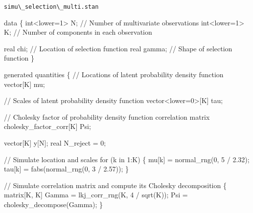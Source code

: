 \documentclass[
  letterpaper,
  DIV=11,
  numbers=noendperiod]{scrartcl}
\newenvironment{Shaded}{\begin{snugshade}}{\end{snugshade}}
\newcommand{\CommentTok}[1]{\textcolor[rgb]{0.37,0.37,0.37}{#1}}
\newcommand{\ControlFlowTok}[1]{\textcolor[rgb]{0.00,0.23,0.31}{#1}}
\newcommand{\DataTypeTok}[1]{\textcolor[rgb]{0.68,0.00,0.00}{#1}}
\newcommand{\DecValTok}[1]{\textcolor[rgb]{0.68,0.00,0.00}{#1}}
\newcommand{\FloatTok}[1]{\textcolor[rgb]{0.68,0.00,0.00}{#1}}
\newcommand{\KeywordTok}[1]{\textcolor[rgb]{0.00,0.23,0.31}{#1}}
\newcommand{\NormalTok}[1]{\textcolor[rgb]{0.00,0.23,0.31}{#1}}
\begin{document}
\begin{codelisting}

\caption{\texttt{simu\textbackslash\_selection\textbackslash\_multi.stan}}

\begin{Shaded}
\begin{Highlighting}[]
\KeywordTok{data}\NormalTok{ \{}
  \DataTypeTok{int}\NormalTok{\textless{}}\KeywordTok{lower}\NormalTok{=}\DecValTok{1}\NormalTok{\textgreater{} N; }\CommentTok{// Number of multivariate observations}
  \DataTypeTok{int}\NormalTok{\textless{}}\KeywordTok{lower}\NormalTok{=}\DecValTok{1}\NormalTok{\textgreater{} K; }\CommentTok{// Number of components in each observation}
  
  \DataTypeTok{real}\NormalTok{ chi;   }\CommentTok{// Location of selection function}
  \DataTypeTok{real}\NormalTok{ gamma; }\CommentTok{// Shape of selection function}
\NormalTok{\}}

\KeywordTok{generated quantities}\NormalTok{ \{}
  \CommentTok{// Locations of latent probability density function}
  \DataTypeTok{vector}\NormalTok{[K] mu;}

  \CommentTok{// Scales of latent probability density function}
  \DataTypeTok{vector}\NormalTok{\textless{}}\KeywordTok{lower}\NormalTok{=}\DecValTok{0}\NormalTok{\textgreater{}[K] tau;}

  \CommentTok{// Cholesky factor of probability density function correlation matrix}
  \DataTypeTok{cholesky\_factor\_corr}\NormalTok{[K] Psi;}
  
  \DataTypeTok{vector}\NormalTok{[K] y[N];}
  \DataTypeTok{real}\NormalTok{ N\_reject = }\DecValTok{0}\NormalTok{;}
  
  \CommentTok{// Simulate location and scales}
  \ControlFlowTok{for}\NormalTok{ (k }\ControlFlowTok{in} \DecValTok{1}\NormalTok{:K) \{}
\NormalTok{    mu[k] = normal\_rng(}\DecValTok{0}\NormalTok{, }\DecValTok{5}\NormalTok{ / }\FloatTok{2.32}\NormalTok{);}
\NormalTok{    tau[k] = fabs(normal\_rng(}\DecValTok{0}\NormalTok{, }\DecValTok{3}\NormalTok{ / }\FloatTok{2.57}\NormalTok{));}
\NormalTok{  \}}
  
  \CommentTok{// Simulate correlation matrix and compute its Cholesky decomposition}
\NormalTok{  \{}
    \DataTypeTok{matrix}\NormalTok{[K, K] Gamma = lkj\_corr\_rng(K, }\DecValTok{4}\NormalTok{ / sqrt(K));}
\NormalTok{    Psi = cholesky\_decompose(Gamma);}
\NormalTok{  \}}
  

\end{Highlighting}
\end{Shaded}
\end{codelisting}
\end{document}
